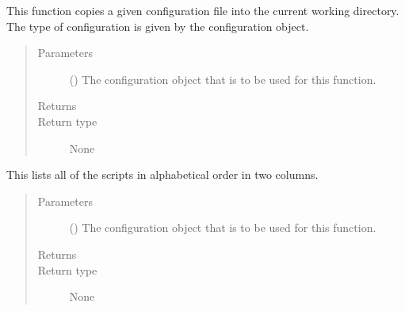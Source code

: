 \documentclass[letterpaper,10pt,english]{sphinxmanual}
\begin{document}
\begin{fulllineitems}
\label{\detokenize{docstrings/ifa_smeargle.special:ifa_smeargle.special.script_special_create_configuration_file}}
This function copies a given configuration file into
the current working directory. The type of configuration is
given by the configuration object.
\begin{quote}\begin{description}
\item[{Parameters}] \leavevmode
{} () \textendash{} The configuration object that is to be used for this
function.

\item[{Returns}] \leavevmode


\item[{Return type}] \leavevmode
None

\end{description}\end{quote}

\end{fulllineitems}


\begin{fulllineitems}
\label{\detokenize{docstrings/ifa_smeargle.special:ifa_smeargle.special.script_special_list_scripts}}
This lists all of the scripts in alphabetical order in
two columns.
\begin{quote}\begin{description}
\item[{Parameters}] \leavevmode
{} () \textendash{} The configuration object that is to be used for this
function.

\item[{Returns}] \leavevmode


\item[{Return type}] \leavevmode
None

\end{description}\end{quote}

\end{fulllineitems}
\end{document}
